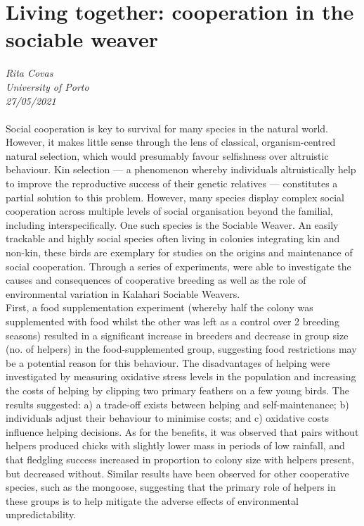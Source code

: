 \documentclass[11pt]{article}
\begin{document}
\section{Living together: cooperation in the sociable weaver}
\textit{Rita Covas\\University of Porto\\27/05/2021}
\\
\\Social cooperation is key to survival for many species in the natural world. However, it makes little sense through the lens of classical, organism-centred natural selection, which would presumably favour selfishness over altruistic behaviour. Kin selection — a phenomenon whereby individuals altruistically help to improve the reproductive success of their genetic relatives — constitutes a partial solution to this problem. However, many species display complex social cooperation across multiple levels of social organisation beyond the familial, including interspecifically. One such species is the Sociable Weaver. An easily trackable and highly social species often living in colonies integrating kin and non-kin, these birds are exemplary for studies on the origins and maintenance of social cooperation.
Through a series of experiments, \cite{covas2008helpers} were able to investigate the causes and consequences of cooperative breeding as well as the role of environmental variation in Kalahari Sociable Weavers.\\First, a food supplementation experiment (whereby half the colony was supplemented with food whilst the other was left as a control over 2 breeding seasons) resulted in a significant increase in breeders and decrease in group size (no. of helpers) in the food-supplemented group, suggesting food restrictions may be a potential reason for this behaviour. The disadvantages of helping were investigated by measuring oxidative stress levels in the population and increasing the costs of helping by clipping two primary feathers on a few young birds. The results suggested: a) a trade-off exists between helping and self-maintenance; b)  individuals adjust their behaviour to minimise costs; and c) oxidative costs influence helping decisions. As for the benefits, it was observed that pairs without helpers produced chicks with slightly lower mass in periods of low rainfall, and that fledgling success increased in proportion to colony size with helpers present, but decreased without. Similar results have been observed for other cooperative species, such as the mongoose, suggesting that the primary role of helpers in these groups is to help mitigate the adverse effects of environmental unpredictability.
\end{document}
